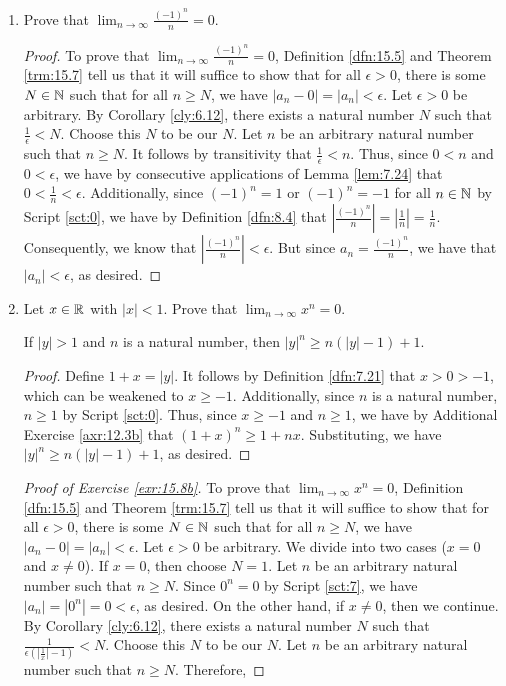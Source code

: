 \documentclass[../main.tex]{subfiles}
\begin{document}
\begin{exercise}\label{exr:15.8}\leavevmode
    \begin{enumerate}[label={(\alph*)},ref={\theexercise\alph*}]
        \item \label{exr:15.8a}Prove that $\lim_{n\to\infty}\frac{(-1)^n}{n}=0$.
        \begin{proof}
            To prove that $\lim_{n\to\infty}\frac{(-1)^n}{n}=0$, Definition \ref{dfn:15.5} and Theorem \ref{trm:15.7} tell us that it will suffice to show that for all $\epsilon>0$, there is some $N\in\mathbb{N}$ such that for all $n\geq N$, we have $|a_n-0|=|a_n|<\epsilon$. Let $\epsilon>0$ be arbitrary. By Corollary \ref{cly:6.12}, there exists a natural number $N$ such that $\frac{1}{\epsilon}<N$. Choose this $N$ to be our $N$. Let $n$ be an arbitrary natural number such that $n\geq N$. It follows by transitivity that $\frac{1}{\epsilon}<n$. Thus, since $0<n$ and $0<\epsilon$, we have by consecutive applications of Lemma \ref{lem:7.24} that $0<\frac{1}{n}<\epsilon$. Additionally, since $(-1)^n=1$ or $(-1)^n=-1$ for all $n\in\mathbb{N}$ by Script \ref{sct:0}, we have by Definition \ref{dfn:8.4} that $|\frac{(-1)^n}{n}|=|\frac{1}{n}|=\frac{1}{n}$. Consequently, we know that $|\frac{(-1)^n}{n}|<\epsilon$. But since $a_n=\frac{(-1)^n}{n}$, we have that $|a_n|<\epsilon$, as desired.
        \end{proof}
        \item \label{exr:15.8b}Let $x\in\mathbb{R}$ with $|x|<1$. Prove that $\lim_{n\to\infty}x^n=0$.
        \begin{lemma*}
            If $|y|>1$ and $n$ is a natural number, then $|y|^n\geq n(|y|-1)+1$.
            \begin{proof}
                Define $1+x=|y|$. It follows by Definition \ref{dfn:7.21} that $x>0>-1$, which can be weakened to $x\geq -1$. Additionally, since $n$ is a natural number, $n\geq 1$ by Script \ref{sct:0}. Thus, since $x\geq -1$ and $n\geq 1$, we have by Additional Exercise \ref{axr:12.3b} that $(1+x)^n\geq 1+nx$. Substituting, we have $|y|^n\geq n(|y|-1)+1$, as desired.
            \end{proof}
        \end{lemma*}
        \begin{proof}[Proof of Exercise \ref{exr:15.8b}]
            To prove that $\lim_{n\to\infty}x^n=0$, Definition \ref{dfn:15.5} and Theorem \ref{trm:15.7} tell us that it will suffice to show that for all $\epsilon>0$, there is some $N\in\mathbb{N}$ such that for all $n\geq N$, we have $|a_n-0|=|a_n|<\epsilon$. Let $\epsilon>0$ be arbitrary. We divide into two cases ($x=0$ and $x\neq 0$). If $x=0$, then choose $N=1$. Let $n$ be an arbitrary natural number such that $n\geq N$. Since $0^n=0$ by Script \ref{sct:7}, we have $|a_n|=|0^n|=0<\epsilon$, as desired. On the other hand, if $x\neq 0$, then we continue. By Corollary \ref{cly:6.12}, there exists a natural number $N$ such that $\frac{1}{\epsilon(|\frac{1}{x}|-1)}<N$. Choose this $N$ to be our $N$. Let $n$ be an arbitrary natural number such that $n\geq N$. Therefore,

\end{proof}
\end{enumerate}
\end{exercise}
\end{document}
